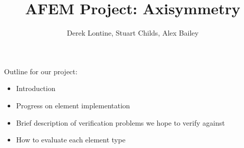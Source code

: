 \documentclass[10pt,letterpaper]{report}
\author{Derek Lontine, Stuart Childs, Alex Bailey}
\title{AFEM Project: Axisymmetry}
\begin{document}
\maketitle

Outline for our project:
\begin{itemize}
\item{Introduction}
\item{Progress on element implementation}
\item{Brief description of verification problems we hope to verify against}
\item{How to evaluate each element type}
\end{itemize}
\end{document}
